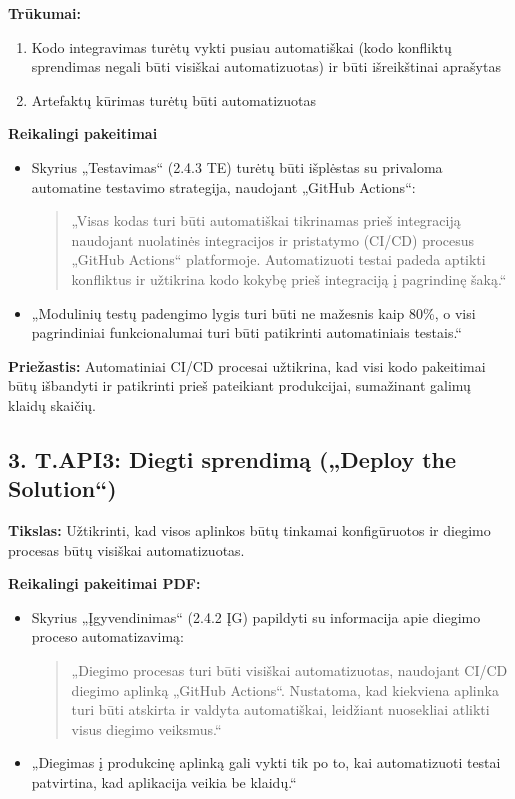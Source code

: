 \documentclass{article}
\begin{document}
\textbf{Trūkumai:} 
\begin{enumerate}
\item Kodo integravimas turėtų vykti pusiau automatiškai (kodo konfliktų sprendimas negali būti visiškai automatizuotas) ir būti išreikštinai aprašytas
\item Artefaktų kūrimas turėtų būti automatizuotas
\end{enumerate}

\textbf{Reikalingi pakeitimai}
\begin{itemize}
    \item Skyrius „Testavimas“ (2.4.3 TE) turėtų būti išplėstas su privaloma automatine testavimo strategija, naudojant „GitHub Actions“:
    \begin{quote}
    „Visas kodas turi būti automatiškai tikrinamas prieš integraciją naudojant nuolatinės integracijos ir pristatymo (CI/CD) procesus „GitHub Actions“ platformoje. Automatizuoti testai padeda aptikti konfliktus ir užtikrina kodo kokybę prieš integraciją į pagrindinę šaką.“
    \end{quote}
    \item „Modulinių testų padengimo lygis turi būti ne mažesnis kaip 80\%, o visi pagrindiniai funkcionalumai turi būti patikrinti automatiniais testais.“
\end{itemize}

\textbf{Priežastis:} Automatiniai CI/CD procesai užtikrina, kad visi kodo pakeitimai būtų išbandyti ir patikrinti prieš pateikiant produkcijai, sumažinant galimų klaidų skaičių.

\subsection*{3. T.API3: Diegti sprendimą („Deploy the Solution“) }

\textbf{Tikslas:} Užtikrinti, kad visos aplinkos būtų tinkamai konfigūruotos ir diegimo procesas būtų visiškai automatizuotas.

\textbf{Reikalingi pakeitimai PDF:}
\begin{itemize}
    \item Skyrius „Įgyvendinimas“ (2.4.2 ĮG) papildyti su informacija apie diegimo proceso automatizavimą:
    \begin{quote}
    „Diegimo procesas turi būti visiškai automatizuotas, naudojant CI/CD diegimo aplinką „GitHub Actions“. Nustatoma, kad kiekviena aplinka turi būti atskirta ir valdyta automatiškai, leidžiant nuosekliai atlikti visus diegimo veiksmus.“
    \end{quote}
    \item „Diegimas į produkcinę aplinką gali vykti tik po to, kai automatizuoti testai patvirtina, kad aplikacija veikia be klaidų.“
\end{itemize}
\end{document}
